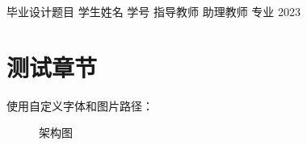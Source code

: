 \documentclass{document}
\begin{document}
\makecover
  {毕业设计题目}
  {学生姓名}
  {学号}
  {指导教师}
  {助理教师}
  {专业}
  {2023}

  \section{测试章节}
使用自定义字体和图片路径：
\begin{figure}[htbp]
  \centering
  \caption{架构图}
\end{figure}

\end{document}
